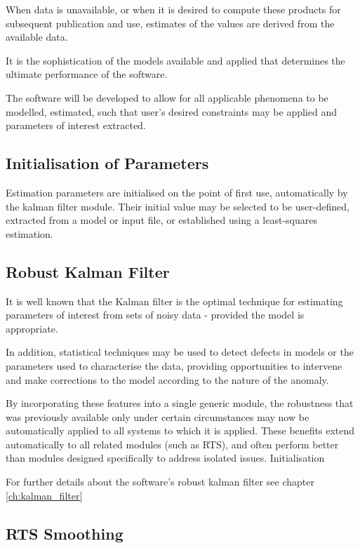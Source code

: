 When data is unavailable, or when it is desired to compute these products for subsequent publication and use, estimates of the values are derived from the available data.

It is the sophistication of the models available and applied that determines the ultimate performance of the software.

The software will be developed to allow for all applicable phenomena to be modelled, estimated, such that user’s desired constraints may be applied and parameters of interest extracted.


\subsection{Initialisation of Parameters}

Estimation parameters are initialised on the point of first use, automatically by the kalman filter module. Their initial value may be selected to be user-defined, extracted from a model or input file, or established using a least-squares estimation.


\subsection{Robust Kalman Filter}

It is well known that the Kalman filter is the optimal technique for estimating parameters of interest from sets of noisy data - provided the model is appropriate.

In addition, statistical techniques may be used to detect defects in models or the parameters used to characterise the data, providing opportunities to intervene and make corrections to the model according to the nature of the anomaly.

By incorporating these features into a single generic module, the robustness that was previously available only under certain circumstances may now be automatically applied to all systems to which it is applied. These benefits extend automatically to all related modules (such as RTS), and often perform better than modules designed specifically to address isolated issues.
Initialisation

For further details about the software's robust kalman filter see chapter \ref{ch:kalman_filter}


\subsection{RTS Smoothing}

